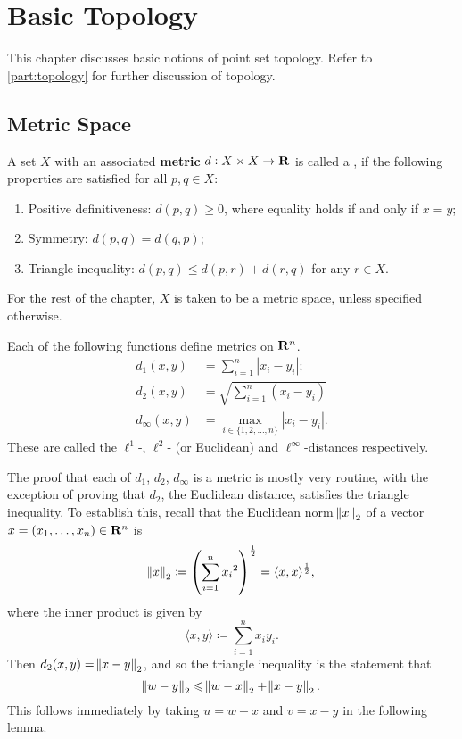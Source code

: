 \chapter{Basic Topology}\label{chap:basic-topology}
This chapter discusses basic notions of point set topology. Refer to \cref{part:topology} for further discussion of topology.

\section{Metric Space}
\begin{definition}
A set $X$ with an associated \textbf{metric} $d:X\times X\to\mathbf R$ is called a , if the following properties are satisfied for all $p,q\in X$:
\begin{enumerate}[label=(\roman*)]
\item Positive definitiveness: $d(p,q)\ge0$, where equality holds if and only if $x=y$;
\item Symmetry: $d(p,q)=d(q,p)$;
\item Triangle inequality: $d(p,q)\le d(p,r)+d(r,q)$ for any $r\in X$.
\end{enumerate}
\end{definition}

For the rest of the chapter, $X$ is taken to be a metric space, unless specified otherwise.

\begin{example}\label{exmp:r-metrics}
Each of the following functions define metrics on $\mathbf R^n$.
\begin{align*}
d_1(x,y)&=\sum_{i=1}^{n}|x_i-y_i|;\\
d_2(x,y)&=\sqrt{\sum_{i=1}^{n}(x_i-y_i)}\\
d_\infty(x,y)&=\max_{i\in\{1,2,\dots,n\}}|x_i-y_i|.
\end{align*}
These are called the $\ell^1$-, $\ell^2$- (or Euclidean) and $\ell^\infty$-distances respectively.
\end{example}

The proof that each of $d_1$, $d_2$, $d_\infty$ is a metric is mostly very routine, with the exception of proving that $d_2$, the Euclidean distance, satisfies the triangle inequality. To establish this, recall that the Euclidean norm $\norm{x}_2$ of a vector $x=(x_1,\dots,x_n)\in\mathbf R^n$ is
\[\norm{x}_2\coloneqq\left(\sum_{i=1}^n{x_i}^2\right)^\frac{1}{2}=\langle x,x\rangle^\frac{1}{2},\]
where the inner product is given by
\[\langle x,y\rangle\coloneqq\sum_{i=1}^{n}x_i y_i.\]
Then $d_2(x,y)=\norm{x-y}_2$, and so the triangle inequality is the statement that
\[\norm{w-y}_2\leqslant\norm{w-x}_2+\norm{x-y}_2.\]
This follows immediately by taking $u=w-x$ and $v=x-y$ in the following lemma.

